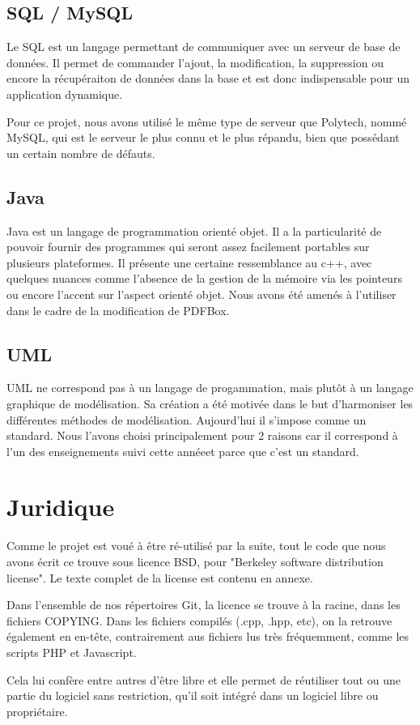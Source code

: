         \subsection{SQL / MySQL}
Le SQL est un langage permettant de communiquer avec un serveur de base de données. 
Il permet de commander l'ajout, la modification, la suppression ou encore la 
récupéraiton de données dans la base et est donc indispensable pour un application 
dynamique.

Pour ce projet, nous avons utilisé le même type de serveur que Polytech, nommé
MySQL, qui est le serveur le plus connu et le plus répandu, bien que possédant 
un certain nombre de défauts.


        \subsection{Java}
Java est un langage de programmation orienté objet. Il a la particularité de 
pouvoir fournir des programmes qui seront assez facilement portables sur plusieurs 
plateformes. Il présente une certaine ressemblance au c++, avec quelques nuances 
comme l'absence de la gestion de la mémoire via les pointeurs ou encore l'accent 
sur l'aspect orienté objet. Nous avons été amenés à l'utiliser dans le cadre de 
la modification de PDFBox. 


       \subsection{UML}
UML ne correspond pas à un langage de progammation, mais plutôt à un langage 
graphique de modélisation. Sa création a été motivée dans le but d'harmoniser les
différentes méthodes de modélisation. Aujourd'hui il s'impose comme un standard. 
Nous l'avons choisi principalement pour 2 raisons car il correspond à l'un des 
enseignements suivi cette annéeet parce que c'est un standard.



    \section{Juridique}
Comme le projet est voué à être ré-utilisé par la suite, tout le code que nous 
avons écrit ce trouve sous licence BSD, pour "Berkeley software distribution
license". Le texte complet de la license est contenu en annexe.

Dans l'ensemble de nos répertoires Git, la licence se trouve à la racine, dans les
fichiers COPYING. Dans les fichiers compilés (.cpp, .hpp, etc), on la retrouve
également en en-tête, contrairement aus fichiers lus très fréquemment, comme les
scripts PHP et Javascript.

Cela lui confère entre autres d'être libre et elle permet de réutiliser tout ou 
une partie du logiciel sans restriction, qu'il soit intégré dans un logiciel libre 
ou propriétaire.

